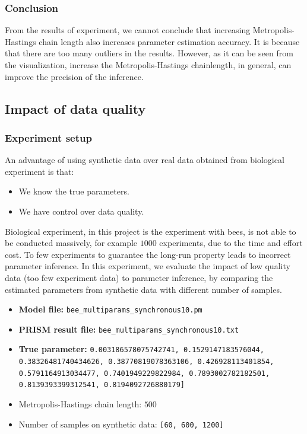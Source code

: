 \documentclass[12pt]{article}
\theoremstyle{definition}
\begin{document}
\subsubsection{Conclusion}
From the results of experiment, we cannot conclude that increasing
Metropolis-Hastings chain length also increases parameter estimation accuracy.
It is because that there are too many outliers in the results. However, as it
can be seen from the visualization, increase the Metropolis-Hastings
chainlength, in general, can improve the precision of the inference.

\subsection{Impact of data quality}
\subsubsection{Experiment setup}
An advantage of using synthetic data over real data obtained from biological
experiment is that:
\begin{itemize}
\item We know the true parameters.
\item We have control over data quality.
\end{itemize}
Biological experiment, in this project is the experiment with bees, is not able
to be conducted massively, for example $1000$ experiments, due to the time and
effort cost. To few experiments to guarantee the long-run property leads to
incorrect parameter inference. In this experiment, we evaluate the impact of
low quality data (too few experiment data) to parameter inference, by comparing
the estimated parameters from synthetic data with different number of samples.
\begin{itemize}
\item \textbf{Model file:} \texttt{bee\_multiparams\_synchronous10.pm}
\item \textbf{PRISM result file:} \texttt{bee\_multiparams\_synchronous10.txt}
\item \textbf{True parameter:} \texttt{0.003186578075742741, 0.1529147183576044,
    0.38326481740434626, 0.38770819078363106, 0.426928113401854,
    0.5791164913034477, 0.7401949229822984, 0.7893002782182501,
    0.8139393399312541, 0.8194092726880179]}
\item Metropolis-Hastings chain length: $500$
\item Number of samples on synthetic data: \texttt{[60, 600, 1200]}
\end{itemize}
\end{document}
